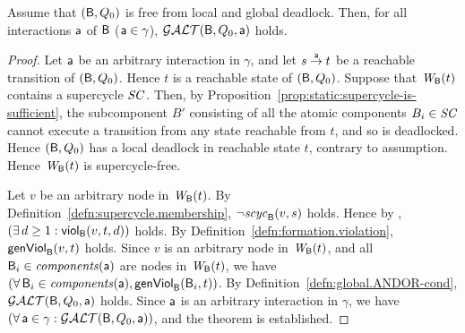 \begin{theorem}
\label{theorem:gao-is-complete}
Assume that $(\B,Q_0)$ is free from local and global deadlock. 
Then,  for all interactions $\act$ of $\B$ (\ie $\act \in \gamma$), 
$\GAO(\B,Q_0,\act)$ holds.
\end{theorem}
%
\begin{proof}
Let $\act$ be an arbitrary interaction in $\gamma$, and let 
$s \goesto[\act] t$ be a reachable transition of $(\B, Q_0)$.
Hence $t$ is a reachable state of $(\B,Q_0)$.
Suppose that $\wfg{\B}{t}$ contains a supercycle $\SC$. Then, by 
Proposition~\ref{prop:static:supercycle-is-sufficient}, the
subcomponent $B'$ consisting of all the atomic components $B_i \in \SC$
cannot execute a transition from any state reachable from $t$, and so is deadlocked.
Hence $(\B,Q_0)$ has a local deadlock in reachable state $t$, contrary to assumption.
Hence $\wfg{\B}{t}$ is supercycle-free.

Let $v$ be an arbitrary node in $\wfg{\B}{t}$.
By Definition~\ref{defn:supercycle.membership}, $\neg \scyc{\B}{s}{v}$ holds.
Hence by , $(\ex d \ge 1: \viol{v}{d}{t})$ holds.
By Definition~\ref{defn:formation.violation},  $\genViol{v}{t}$ holds.
Since $v$ is an arbitrary node in $\wfg{\B}{t}$, and all $\B_i \in \comps{\act}$ are nodes in 
$\wfg{\B}{t}$, we have $(\fas \B_i \in \comps{\act}, \formViol{\B_i}{t})$.
By Definition~\ref{defn:global.ANDOR-cond}, $\GAO(\B, Q_0, \act)$ holds.
Since $\act$ is an arbitrary interaction in $\gamma$, we have
$(\fas \act \in \gamma: \GAO(\B,Q_0,\act))$, and the theorem is established.
\end{proof}